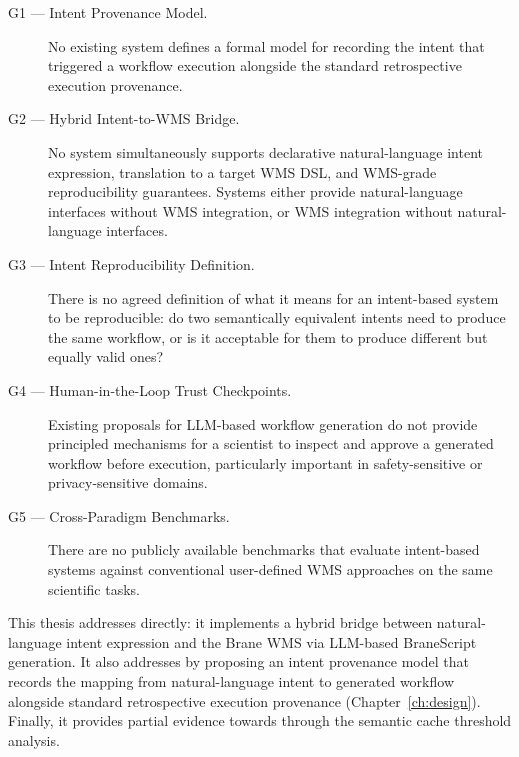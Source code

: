 \begin{description}
    \label{gap:1}
    \item[G1 --- Intent Provenance Model.] No existing system defines a formal
        model for recording the intent that triggered a workflow execution
        alongside the standard retrospective execution provenance.

    \label{gap:2}
    \item[G2 --- Hybrid Intent-to-WMS Bridge.] No system simultaneously supports
        declarative natural-language intent expression, translation to a
        target WMS DSL, and WMS-grade reproducibility guarantees. Systems either
        provide natural-language interfaces without WMS integration, or WMS
        integration without natural-language interfaces.

    \label{gap:3}
    \item[G3 --- Intent Reproducibility Definition.] There is no agreed
        definition of what it means for an intent-based system to be
        reproducible: do two semantically equivalent intents need to produce the
        same workflow, or is it acceptable for them to produce different but
        equally valid ones?

    \label{gap:4}
    \item[G4 --- Human-in-the-Loop Trust Checkpoints.] Existing proposals
        for LLM-based workflow generation do not provide principled mechanisms
        for a scientist to inspect and approve a generated workflow before
        execution, particularly important in safety-sensitive or privacy-sensitive
        domains.

    \label{gap:5}
    \item[G5 --- Cross-Paradigm Benchmarks.] There are no publicly available
        benchmarks that evaluate intent-based systems against conventional user-defined WMS
        approaches on the same scientific tasks.
\end{description}

This thesis addresses  directly: it implements a hybrid bridge
between natural-language intent expression and the Brane WMS via LLM-based
BraneScript generation. It also addresses  by proposing an intent
provenance model that records the mapping from natural-language intent to
generated workflow alongside standard retrospective execution provenance
(Chapter~\ref{ch:design}). Finally, it provides partial evidence towards 
through the semantic cache threshold analysis.

